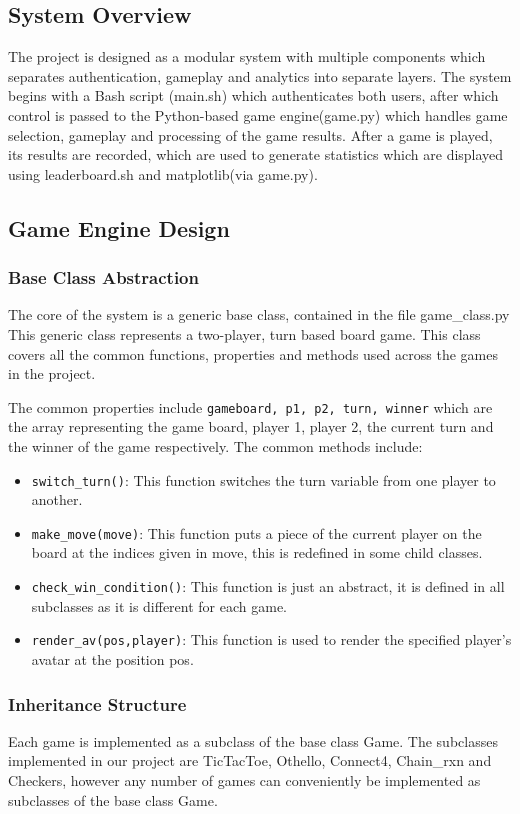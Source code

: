 \documentclass[12pt, letter]{article}
\begin{document}
\subsection{System Overview}
The project is designed as a modular system with multiple components which separates authentication, gameplay and analytics into separate layers. The system begins with a Bash script (main.sh) which authenticates both users, after which control is passed to the Python-based game engine(game.py) which handles game selection, gameplay and processing of the game results. After a game is played, its results are recorded, which are used to generate statistics which are displayed using leaderboard.sh and matplotlib(via game.py).

\subsection{Game Engine Design}
\subsubsection{Base Class Abstraction}
The core of the system is a generic base class, contained in the file game\_class.py This generic class represents a two-player, turn based board game. This class covers all the common functions, properties and methods used across the games in the project. 

The common properties include \texttt{gameboard, p1, p2, turn, winner} which are the array representing the game board, player 1, player 2, the current turn and the winner of the game respectively. The common methods include:
\begin{itemize}
    \item \texttt{switch\_turn()}: This function switches the turn variable from one player to another.
    \item \texttt{make\_move(move)}: This function puts a piece of the current player on the board at the indices given in move, this is redefined in some child classes.
    \item \texttt{check\_win\_condition()}: This function is just an abstract, it is defined in all subclasses as it is different for each game.
    \item \texttt{render\_av(pos,player)}: This function is used to render the specified player's avatar at the position pos.
\end{itemize}
\subsubsection{Inheritance Structure}
Each game is implemented as a subclass of the base class Game. The subclasses implemented in our project are TicTacToe, Othello, Connect4, Chain\_rxn and Checkers, however any number of games can conveniently be implemented as subclasses of the base class Game.
\end{document}
